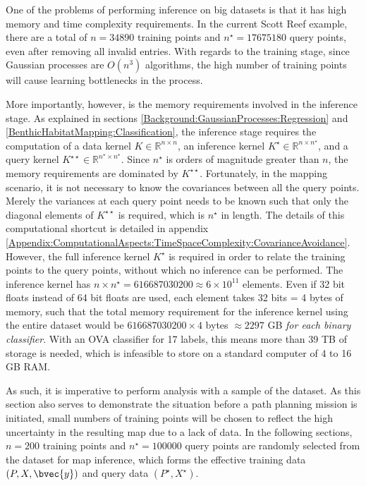 			One of the problems of performing inference on big datasets is that it has high memory and time complexity requirements. In the current Scott Reef example, there are a total of $n = 34890$ training points and $n^{\star} = 17675180$ query points, even after removing all invalid entries. With regards to the training stage, since Gaussian processes are $O(n^{3})$ algorithms, the high number of training points will cause learning bottlenecks in the process.
			
			More importantly, however, is the memory requirements involved in the inference stage. As explained in sections \ref{Background:GaussianProcesses:Regression} and \ref{BenthicHabitatMapping:Classification}, the inference stage requires the computation of a data kernel $K \in \mathbb{R}^{n \times n}$, an inference kernel $K^{\star} \in \mathbb{R}^{n \times n^{\star}}$, and a query kernel $K^{\star \star} \in \mathbb{R}^{n^{\star} \times n^{\star}}$. Since $n^{\star}$ is orders of magnitude greater than $n$, the memory requirements are dominated by $K^{\star \star}$. Fortunately, in the mapping scenario, it is not necessary to know the covariances between all the query points. Merely the variances at each query point needs to be known such that only the diagonal elements of $K^{\star \star}$ is required, which is $n^{\star}$ in length. The details of this computational shortcut is detailed in appendix \ref{Appendix:ComputationalAspects:TimeSpaceComplexity:CovarianceAvoidance}. However, the full inference kernel $K^{\star}$ is required in order to relate the training points to the query points, without which no inference can be performed. The inference kernel has $n \times n^{\star} = 616687030200 \approx 6 \times 10^{11}$ elements. Even if 32 bit floats instead of 64 bit floats are used, each element takes 32 bits = 4 bytes of memory, such that the total memory requirement for the inference kernel using the entire dataset would be $616687030200 \times 4$ bytes $\approx 2297$ GB \textit{for each binary classifier}. With an OVA classifier for 17 labels, this means more than 39 TB of storage is needed, which is infeasible to store on a standard computer of 4 to 16 GB RAM.
			
			As such, it is imperative to perform analysis with a sample of the dataset. As this section also serves to demonstrate the situation before a path planning mission is initiated, small numbers of training points will be chosen to reflect the high uncertainty in the resulting map due to a lack of data. In the following sections, $n = 200$ training points and $n^{\star} = 100000$ query points are randomly selected from the dataset for map inference, which forms the effective training data $(P, X, \bvec{y})$ and query data $(P^{\star}, X^{\star})$.
			
